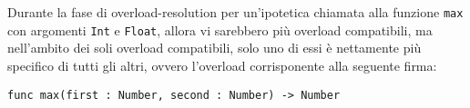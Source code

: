 Durante la fase di overload-resolution per un'ipotetica chiamata alla funzione \texttt{max}
con argomenti \texttt{Int} e \texttt{Float}, allora vi sarebbero più overload compatibili, 
ma nell’ambito dei soli overload compatibili, solo uno di essi è nettamente più specifico 
di tutti gli altri, ovvero l'overload corrisponente alla seguente firma:

\vspace{0.5cm}
\begin{lstlisting}[frame=single]
func max(first : Number, second : Number) -> Number
\end{lstlisting}
\vspace{0.5cm}

\newpage